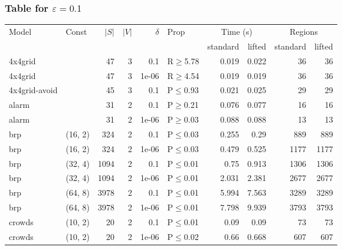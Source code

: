 \subsubsection{Table for \(\varepsilon=0.1\)}
\begin{longtable}{llrrrlrrrr}

        \toprule
        Model & Const & $|S|$ & $|V|$ & $\delta$ & Prop & \multicolumn{2}{c}{Time (s)} & \multicolumn{2}{c}{Regions} \\
        \cmidrule(ll){7-8} \cmidrule(ll){9-10}
        & & & & & & standard & lifted & standard & lifted \\
        \midrule
        
 4x4grid       &           &     	47 &   3 & 0.1   & R$\geq$5.78  & 0.019  & 0.022  & 36      & 36      \\
 4x4grid       &           &     	47 &   3 & 1e-06 & R$\geq$4.54  & 0.019  & 0.019  & 36      & 36      \\
 4x4grid-avoid &           &     	45 &   3 & 0.1   & P$\leq$0.93  & 0.021  & 0.025  & 29      & 29      \\
 alarm         &           &     	31 &   2 & 0.1   & P$\geq$0.21  & 0.076  & 0.077  & 16      & 16      \\
 alarm         &           &     	31 &   2 & 1e-06 & P$\geq$0.03  & 0.088  & 0.088  & 13      & 13      \\
 brp           & (16, 2)   &    	324 &   2 & 0.1   & P$\leq$0.03  & 0.255  & 0.29   & 889     & 889     \\
 brp           & (16, 2)   &    	324 &   2 & 1e-06 & P$\leq$0.03  & 0.479  & 0.525  & 1177    & 1177    \\
 brp           & (32, 4)   &   	1094 &   2 & 0.1   & P$\leq$0.01  & 0.75   & 0.913  & 1306    & 1306    \\
 brp           & (32, 4)   &   	1094 &   2 & 1e-06 & P$\leq$0.01  & 2.031  & 2.381  & 2677    & 2677    \\
 brp           & (64, 8)   &   	3978 &   2 & 0.1   & P$\leq$0.01  & 5.994  & 7.563  & 3289    & 3289    \\
 brp           & (64, 8)   &   	3978 &   2 & 1e-06 & P$\leq$0.01  & 7.798  & 9.939  & 3793    & 3793    \\
 crowds        & (10, 2)   &     	20 &   2 & 0.1   & P$\leq$0.01  & 0.09   & 0.09   & 73      & 73      \\
 crowds        & (10, 2)   &     	20 &   2 & 1e-06 & P$\leq$0.02  & 0.66   & 0.668  & 607     & 607     \\

\end{longtable}
